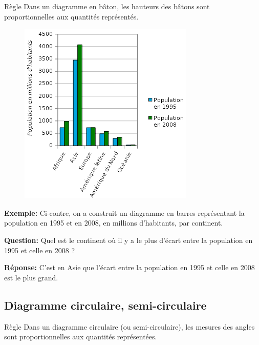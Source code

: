 \documentclass[12pt,a4paper]{article}
\begin{document}
\begin{definition}{Règle}
Dans un diagramme en bâton, les hauteurs des bâtons sont proportionnelles aux quantités représentés.
\end{definition}

\begin{figure}
\vspace{-30pt}
  \begin{center}
	\includegraphics[scale=0.85]{img/diag-bat.png}
  \end{center}
 \vspace{-120pt}
\end{figure}

\textbf{Exemple:} Ci-contre, on a construit un diagramme en barres représentant la population en 1995 et en 2008, en millions d'habitants, par continent.

\textbf{Question:} Quel est le continent où il y a le plus d'écart entre la population en 1995 et celle en 2008 ?

\textbf{Réponse:} C'est en Asie que l'écart entre la population en 1995 et celle en 2008 est le plus grand.

\newpage
\subsection{Diagramme circulaire, semi-circulaire}

\begin{definition}{Règle}
Dans un diagramme circulaire (ou semi-circulaire), les mesures des angles sont proportionnelles aux quantités représentées. 
\end{definition}
\end{document}
